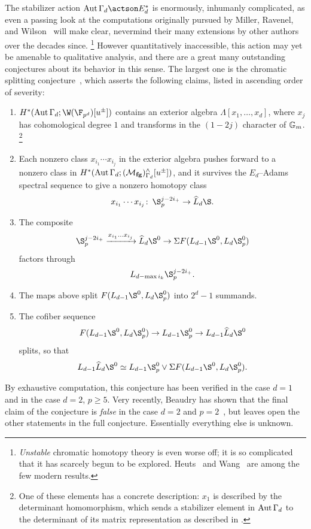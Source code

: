 The stabilizer action \(\Aut \Gamma_d \actson E_d^*\) is enormously, inhumanly complicated, as even a passing look at the computations originally pursued by Miller, Ravenel, and Wilson~\cite{MRW} will make clear, nevermind their many extensions by other authors over the decades since.%
\footnote{%
\emph{Unstable} chromatic homotopy theory is even worse off; it is so complicated that it has scarcely begun to be explored.
Heuts~\cite{Heuts} and Wang~\cite{Wang} are among the few modern results.
}
However quantitatively inaccessible, this action may yet be amenable to qualitative analysis, and there are a great many outstanding conjectures about its behavior in this sense.
The largest one is the chromatic splitting conjecture~\cite[Conjecture 4.2]{HoveyCSC}, which asserts the following claims, listed in ascending order of severity:
\begin{enumerate}
    \item \(H^*(\Aut \Gamma_d; \W(\F_{p^d})[u^\pm])\) contains an exterior algebra \(\Lambda[x_1, \ldots, x_d]\), where \(x_j\) has cohomological degree \(1\) and transforms in the \((1 - 2j)\){\th} character of \(\mathbb G_m\).%
\footnote{%
          One of these elements has a concrete description: \(x_1\) is described by the determinant homomorphism, which sends a stabilizer element in \(\operatorname{Aut} \Gamma_d\) to the determinant of its matrix representation as described in .
}
    \item Each nonzero class \(x_{i_1} \cdots x_{i_j}\) in the exterior algebra pushes forward to a nonzero class in \(H^*(\operatorname{Aut} \Gamma_d; (\mathcal{M}_{\mathbf{fg}})^\wedge_{\Gamma_d}[u^\pm])\), and it survives the \(E_d\)--Adams spectral sequence to give a nonzero homotopy class \[x_{i_1} \cdots x_{i_j}\co \S_p^{j-2i_+} \to \widehat L_d \S.\]
    \item The composite \[\S_p^{j-2i_+} \xrightarrow{x_{i_1} \ldots x_{i_j}} \widehat L_d \S^0 \to \Susp F(L_{d-1} \S^0, L_d \S_p^0)\] factors through \[L_{d - \max i_k} \S_p^{j-2i_+}.\]
    \item The maps above split \(F(L_{d-1} \S^0, L_d \S^0_p)\) into \(2^d-1\) summands.
    \item The cofiber sequence \[F(L_{d-1} \S^0, L_d \S^0_p) \to L_{d-1} \S^0_p \to L_{d-1} \widehat L_d \S^0\] splits, so that \[L_{d-1} \widehat L_d \S^0 \simeq L_{d-1} \S^0_p \vee \Susp F(L_{d-1} \S^0, L_d \S^0_p).\]
\end{enumerate}
By exhaustive computation, this conjecture has been verified in the case \(d = 1\) and in the case \(d = 2\), \(p \ge 5\).
Very recently, Beaudry has shown that the final claim of the conjecture is \emph{false} in the case \(d = 2\) and \(p = 2\)~\cite{Beaudry}, but leaves open the other statements in the full conjecture.
Essentially everything else is unknown.

